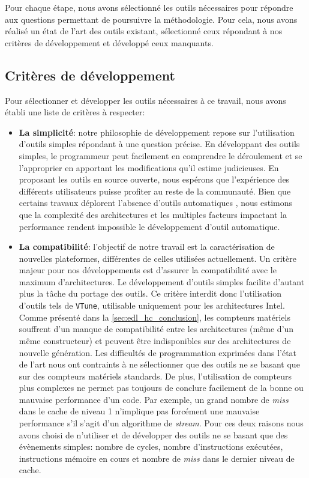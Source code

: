     Pour chaque étape, nous avons sélectionné les outils nécessaires pour répondre aux questions permettant de poursuivre la méthodologie. Pour cela, nous avons réalisé un état de l'art des outils existant, sélectionné ceux répondant à nos critères de développement et développé ceux manquants.
    

        
\subsection{Critères de développement}
    
    Pour sélectionner et développer les outils nécessaires à ce travail, nous avons établi une liste de critères à respecter:
    \begin{itemize}
        \item \textbf{La simplicité}: notre philosophie de développement repose sur l'utilisation d'outils simples répondant à une question précise. En développant des outils simples, le programmeur peut facilement en comprendre le déroulement et se l'approprier en apportant les modifications qu'il estime judicieuses. En proposant les outils en source ouverte, nous espérons que l'expérience des différents utilisateurs puisse profiter au reste de la communauté. Bien que certains travaux déplorent l'absence d'outils automatiques \cite{Chung2012}, nous estimons que la complexité des architectures et les multiples facteurs impactant la performance rendent impossible le développement d'outil automatique.\\
        
        \item \textbf{La compatibilité}: l'objectif de notre travail est la caractérisation de nouvelles plateformes, différentes de celles utilisées actuellement. Un critère majeur pour nos développements est d'assurer la compatibilité avec le maximum d'architectures. Le développement d'outils simples facilite d'autant plus la tâche du portage des outils. Ce critère interdit donc l'utilisation d'outils tels de \verb=VTune=, utilisable uniquement pour les architectures Intel.
        Comme présenté dans la \autoref{sec:edl_hc_conclusion}, les compteurs matériels souffrent d'un manque de compatibilité entre les architectures (même d'un même constructeur) et peuvent être indisponibles sur des architectures de nouvelle génération. Les difficultés de programmation exprimées dans l'état de l'art nous ont contraints à ne sélectionner que des outils ne se basant que sur des compteurs matériels standards. De plus, l'utilisation de compteurs plus complexes ne permet pas toujours de conclure facilement de la bonne ou mauvaise performance d'un code. Par exemple, un grand nombre de \textit{miss} dans le cache de niveau 1 n'implique pas forcément une mauvaise performance s'il s'agit d'un algorithme de \textit{stream}. Pour ces deux raisons nous avons choisi de n'utiliser et de développer des outils ne se basant que des évènements simples: nombre de cycles, nombre d'instructions exécutées, instructions mémoire en cours et nombre de \textit{miss} dans le dernier niveau de cache.\\
        

\end{itemize}
